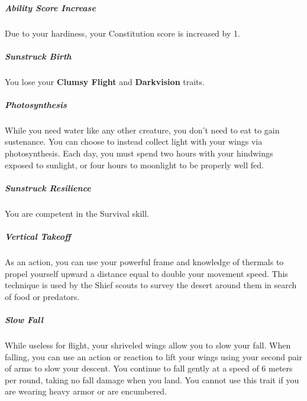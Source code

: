     \subparagraph{Ability Score Increase} Due to your hardiness, your Constitution score is increased by 1.

    \subparagraph{Sunstruck Birth} You lose your \textbf{Clumsy Flight} and \textbf{Darkvision} traits.

    \subparagraph{Photosynthesis} While you need water like any other creature, you don't need to eat to gain sustenance.
    You can choose to instead collect light with your wings via photosynthesis.
    Each day, you must spend two hours with your hindwings exposed to sunlight, or four hours to moonlight to be properly well fed.

    \subparagraph{Sunstruck Resilience} You are competent in the Survival skill.

    \subparagraph{Vertical Takeoff} As an action, you can use your powerful frame and knowledge of thermals to propel yourself upward a distance equal to double your movement speed.
    This technique is used by the Shief scouts to survey the desert around them in search of food or predators.

    \subparagraph{Slow Fall} While useless for flight, your shriveled wings allow you to slow your fall.
    When falling, you can use an action or reaction to lift your wings using your second pair of arms to slow your descent.
    You continue to fall gently at a speed of 6 meters per round, taking no fall damage when you land.
    You cannot use this trait if you are wearing heavy armor or are encumbered.

